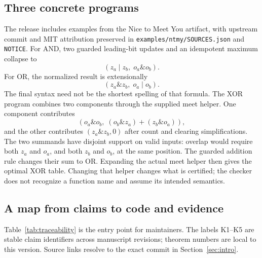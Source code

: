 \subsection{Three concrete programs}
The release includes examples from the Nice to Meet You artifact, with upstream commit and MIT attribution preserved in \texttt{examples/ntmy/SOURCES.json} and \texttt{NOTICE}. For AND, two guarded leading-bit updates and an idempotent maximum collapse to
\[
(z_a\mathbin{|}z_b,\;o_a\mathbin{\&}o_b).
\]
For OR, the normalized result is extensionally
\[
(z_a\mathbin{\&}z_b,\;o_a\mathbin{|}o_b).
\]
The final syntax need not be the shortest spelling of that formula. The XOR program combines two components through the supplied meet helper. One component contributes
\[
(o_a\mathbin{\&}o_b,\;(o_b\mathbin{\&}z_a)+(z_b\mathbin{\&}o_a)),
\]
and the other contributes $(z_a\mathbin{\&}z_b,0)$ after count and clearing simplifications. The two summands have disjoint support on valid inputs: overlap would require both $z_a$ and $o_a$, and both $z_b$ and $o_b$, at the same position. The guarded addition rule changes their sum to OR. Expanding the actual meet helper then gives the optimal XOR table. Changing that helper changes what is certified; the checker does not recognize a function name and assume its intended semantics.

\subsection{A map from claims to code and evidence}
Table~\ref{tab:traceability} is the entry point for maintainers. The labels K1--K5 are stable claim identifiers across manuscript revisions; theorem numbers are local to this version. Source links resolve to the exact commit in Section~\ref{sec:intro}.

